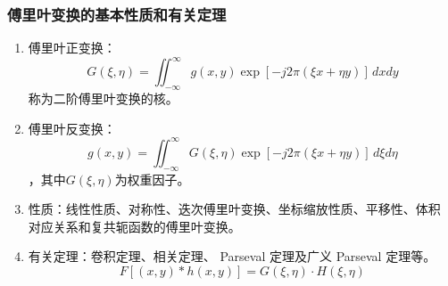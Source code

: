 \documentclass[twocolumn]{ctexart}
\begin{document}
\subsubsection{傅里叶变换的基本性质和有关定理}
\begin{enumerate}
    \item 傅里叶正变换：
          \begin{equation}
              G\left(\xi ,\eta \right)=\iint ^{\infty} _{-\infty} g\left(x,y\right) \exp \left[-j2\pi \left(\xi x+\eta y\right)\right]\,dxdy
              \nonumber
          \end{equation}
          称为二阶傅里叶变换的核。
    \item 傅里叶反变换：
          \begin{equation}
              g\left(x ,y \right)=\iint ^{\infty} _{-\infty} G\left(\xi ,\eta \right) \exp \left[-j2\pi \left(\xi x+\eta y\right)\right]\,d\xi d\eta
              \nonumber
          \end{equation}
          ，其中$G\left(\xi ,\eta\right)$为权重因子。
    \item 性质：线性性质、对称性、迭次傅里叶变换、坐标缩放性质、平移性、体积
          对应关系和复共轭函数的傅里叶变换。
    \item 有关定理：卷积定理、相关定理、 Parseval 定理及广义 Parseval 定理等。
          \begin{equation}
              F\left[\left(x,y\right)\ast h\left(x,y\right)\right]=G\left(\xi,\eta\right) \cdot H\left(\xi ,\eta \right)
              \nonumber
          \end{equation}
\end{enumerate}
\end{document}
